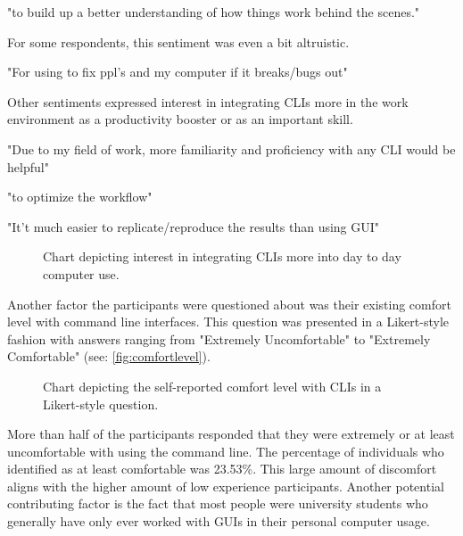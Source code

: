 \begin{quotes}
	"to build up a better understanding of how things work behind the scenes."
\end{quotes}

For some respondents, this sentiment was even a bit altruistic.

\begin{quotes}
	"For using to fix ppl's and my computer if it breaks/bugs out"
\end{quotes}

Other sentiments expressed interest in integrating CLIs more in the work
environment as a productivity booster or as an important skill.


\begin{quotes}
	"Due to my field of work, more familiarity and proficiency with any CLI would be helpful"
\end{quotes}

\begin{quotes}
	"to optimize the workflow"
\end{quotes}

\begin{quotes}
	"It't much easier to replicate/reproduce the results than using GUI"
\end{quotes}

\begin{figure}[htbp]
	\scalebox{0.65}{}
	\caption{Chart depicting interest in integrating CLIs more into day to day computer use.}
	\label{fig:daytoday}
\end{figure}

Another factor the participants were questioned about was their existing
comfort level with command line interfaces. This question was presented in a
Likert-style fashion with answers ranging from "Extremely Uncomfortable" to
"Extremely Comfortable" (see: \autoref{fig:comfortlevel}).

\begin{figure}[H]
	\scalebox{0.72}{}
	\caption{Chart depicting the self-reported comfort level with CLIs in a Likert-style question.}
	\label{fig:comfortlevel}
\end{figure}

More than half of the participants responded that they were extremely or at
least uncomfortable with using the command line. The percentage of individuals
who identified as at least comfortable was 23.53\%. This large amount of
discomfort aligns with the higher amount of low experience participants.
Another potential contributing factor is the fact that most people were
university students who generally have only ever worked with GUIs in their
personal computer usage.


